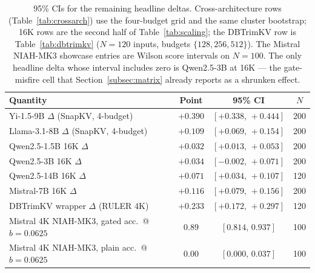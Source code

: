 \begin{table}[t]
\centering
\caption{95\% CIs for the remaining headline deltas. Cross-architecture rows
(Table~\ref{tab:crossarch}) use the four-budget grid and the same cluster
bootstrap; 16K rows are the second half of Table~\ref{tab:scaling}; the
DBTrimKV row is Table~\ref{tab:dbtrimkv} ($N = 120$ inputs, budgets
$\{128, 256, 512\}$). The Mistral NIAH-MK3 showcase entries are Wilson
score intervals on $N = 100$. The only headline delta whose interval
includes zero is Qwen2.5-3B at 16K --- the gate-misfire cell that
Section~\ref{subsec:matrix} already reports as a shrunken effect.}
\label{tab:other-ci}
\begin{tabular}{lccc}
\toprule
Quantity & Point & 95\% CI & $N$ \\
\midrule
Yi-1.5-9B $\Delta$ (SnapKV, 4-budget)      & $+0.390$ & $[+0.338,\,+0.444]$ & 200 \\
Llama-3.1-8B $\Delta$ (SnapKV, 4-budget)   & $+0.109$ & $[+0.069,\,+0.154]$ & 200 \\
\midrule
Qwen2.5-1.5B 16K $\Delta$                  & $+0.032$ & $[+0.013,\,+0.053]$ & 200 \\
Qwen2.5-3B 16K $\Delta$                    & $+0.034$ & $[-0.002,\,+0.071]$ & 200 \\
Qwen2.5-14B 16K $\Delta$                   & $+0.071$ & $[+0.034,\,+0.107]$ & 120 \\
Mistral-7B 16K $\Delta$                    & $+0.116$ & $[+0.079,\,+0.156]$ & 200 \\
\midrule
DBTrimKV wrapper $\Delta$ (RULER 4K)       & $+0.233$ & $[+0.172,\,+0.297]$ & 120 \\
\midrule
Mistral 4K NIAH-MK3, gated acc.\ @ $b{=}0.0625$ & $0.89$ & $[0.814,\,0.937]$ & 100 \\
Mistral 4K NIAH-MK3, plain acc.\ @ $b{=}0.0625$ & $0.00$ & $[0.000,\,0.037]$ & 100 \\
\bottomrule
\end{tabular}
\end{table}



